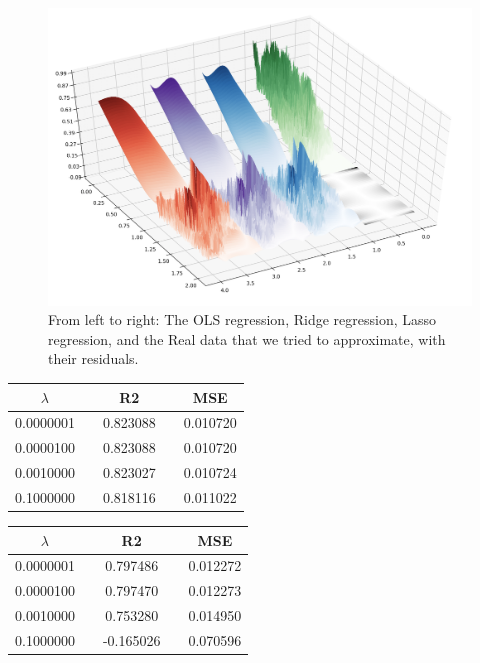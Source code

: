 \begin{figure}[H]
		\centering
		\includegraphics[width=1.1\linewidth]{result/bilder/all_real.png}
		\caption{From left to right: The \color{red}OLS \color{black} regression, \color{purple}{} Ridge \color{black} regression, \color{blue} Lasso \color{black} regression, and the \color{green}Real data \color{black} that we tried to approximate, with their residuals.}
		\label{fig:RealData}
\end{figure}

\pagebreak

 \begin{center}
 \label{tab:Realdata_Ridge_lambda_R2_MSE}
 \begin{tabularx}{\textwidth}{c X c X c  }
     \hline
     \hline
$\lambda$    &&R2     &&MSE     \\
         \hline
0.0000001 && 0.823088 && 0.010720 \\
0.0000100 && 0.823088 && 0.010720 \\
0.0010000 && 0.823027 && 0.010724 \\
0.1000000 && 0.818116 && 0.011022 \\
 \end{tabularx}
 \end{center}



 \begin{center}
 \label{tab:Realdata_Lasso_lambda_R2_MSE}
 \begin{tabularx}{\textwidth}{c X c X c  }
     \hline
     \hline
$\lambda$    &&R2     &&MSE     \\
         \hline
0.0000001 && 0.797486 && 0.012272 \\
0.0000100 && 0.797470 && 0.012273 \\
0.0010000 && 0.753280 && 0.014950 \\
0.1000000 && -0.165026 && 0.070596 \\
 \end{tabularx}
 \end{center}








